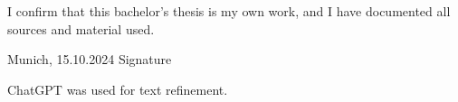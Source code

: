 \documentclass[pdftex,12pt,a4paper]{report}
\begin{document}
\noindent I confirm that this bachelor's thesis is my own work, and I have
documented all sources and material used.

\vspace{3cm}

\noindent Munich, 15.10.2024 \hfill Signature

\pagebreak



\renewcommand{\baselinestretch}{0.95}\normalsize
\tableofcontents
\renewcommand{\baselinestretch}{1.0}\normalsize







\printbibliography

ChatGPT was used for text refinement.
\end{document}
